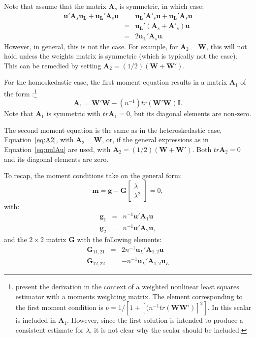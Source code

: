 \documentclass{article}
\begin{document}
Note that \citet[p. 7]{Drukkeretal:10} assume that the matrix $\mathbf{A}_s$ is symmetric,
in which case:
\begin{eqnarray}
\mathbf{u'} \mathbf{A}_s \mathbf{u_L} 
 +  \mathbf{u_L'} \mathbf{A}_s \mathbf{u} &=& \mathbf{u_L'} \mathbf{A'}_s \mathbf{u} 
 +  \mathbf{u_L'} \mathbf{A}_s \mathbf{u}\\
 &=& \mathbf{u_L'} ( \mathbf{A}_s + \mathbf{A'}_s )  \mathbf{u}\\
 &=& 2  \mathbf{u_L'}  \mathbf{A}_s  \mathbf{u}. \label{eq:uulAu}
\end{eqnarray}
However, in general, this is not the case. For example, for $\mathbf{A}_2 = \mathbf{W}$,
this will not hold unless the weights matrix is symmetric (which is typically not the case).
This can be remedied by setting $\mathbf{A}_2 = (1/2)( \mathbf{W} + \mathbf{W'} )$.

For the homoskedastic case, the first moment equation results in a matrix $\mathbf{A}_1$
of the form \citep[see, e.g.,][footnote 7]{KelejianPrucha:10}:\footnote{\citet[Equation 9]{KelejianPrucha:10} present the derivation in the context of a weighted nonlinear
least squares estimator with a moments weighting matrix. The element corresponding
to the first moment condition is $\nu = 1 / [1 + [(n^{-1} tr (\mathbf{WW'})]^2]$. In
\cite{Drukkeretal:10,Drukkeretal:11} this scalar is included in $\mathbf{A}_1$. However, since the
first solution is intended to produce a consistent estimate for $\lambda$, it is not
clear why the scalar should be included.}
\begin{equation*}
\mathbf{A}_1 = \mathbf{W'W} - (n^{-1}) tr (\mathbf{W'W}) \mathbf{I}.
\end{equation*} 
Note that $\mathbf{A}_1$ is symmetric with $tr \mathbf{A}_1 = 0$, but its diagonal
elements are non-zero.
 
The second moment equation is the same as in the heteroskedastic case, Equation~\ref{eq:A2},
with $\mathbf{A}_2 = \mathbf{W}$, or, if the general expressions as in Equation~\ref{eq:uulAu}
are used, with $\mathbf{A}_2 = (1/2) (\mathbf{W} + \mathbf{W'})$. Both $tr \mathbf{A}_2 = 0$
and its diagonal elements are zero.

To recap, the moment conditions take on the general form:
\begin{equation*}
\mathbf{m} = \mathbf{g} - \mathbf{G}
\left[
\begin{matrix}
\lambda\\
\lambda^2
\end{matrix}
\right] = 0,
\end{equation*}
with:
\begin{eqnarray*}
 \mathbf{g}_1 &=& n^{-1} \mathbf{u}' \mathbf{A}_1 \mathbf{u} \\
  \mathbf{g}_2 &=& n^{-1} \mathbf{u}' \mathbf{A}_2 \mathbf{u},
\end{eqnarray*}
and
the $2 \times 2$ matrix $\mathbf{G}$ with the following elements:
\begin{eqnarray}
\mathbf{G}_{11,21} &=& 2n^{-1} \mathbf{u}_L' \mathbf{A}_{1, 2} \mathbf{u} \label{eq:newgcol1}\\
\mathbf{G}_{12,22} &=& - n^{-1} \mathbf{u}_L'  \mathbf{A}_{1, 2} \mathbf{u}_L \label{eq:newgcol2}
\end{eqnarray}
\end{document}
